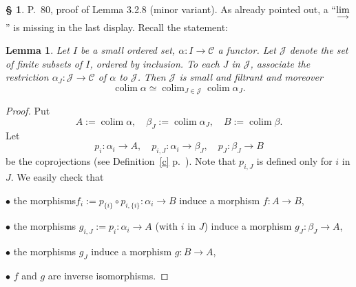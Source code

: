 \documentclass[12pt]{article}%
\newtheorem{lem}[thm]{Lemma}
\theoremstyle{remark}
\theoremstyle{definition}
\newtheorem{s}[thm]{\S}%
\newcommand{\bu}{\bullet}
\newcommand{\nn}{\noindent}
\newcommand{\cc}{\mathcal}
\newcommand{\C}{\mathcal C}
\newcommand{\ilim}{\operatornamewithlimits{\underset{\longrightarrow}{lim}}}
\DeclareMathOperator*{\colim}{colim}%
\begin{document}
\begin{s} 
P.~80, proof of Lemma 3.2.8 (minor variant). As already pointed out, a ``$\ds\ilim$'' is missing in the last display. Recall the statement:
\begin{lem}
Let $I$ be a small ordered set, $\alpha:I\to\C$ a functor. Let $\cc J$ denote the set of finite subsets of $I$, ordered by inclusion. To each $J$ in $\cc J$, associate the restriction $\alpha_J:\cc J\to\C$ of $\alpha$ to $\cc J$. Then $\cc J$ is small and filtrant and moreover
$$
\colim\alpha\simeq\colim_{J\in\cc J}\colim\alpha_J.
$$
\end{lem}
\begin{proof}
Put
$$
A:=\colim\alpha,\quad
\beta_J:=\colim\alpha_J,\quad
B:=\colim\beta.
$$
Let 
$$
p_i:\alpha_i\to A,\quad 
p_{i,J}:\alpha_i\to\beta_J,\quad 
p_J:\beta_J\to B
$$
be the coprojections (see Definition~\ref{c} p.~\pageref{c}). Note that $p_{i,J}$ is defined only for $i$ in $J$. We easily check that 

\nn$\bu$ the morphisms$f_i:=p_{\{i\}}\circ p_{i,\{i\}}:\alpha_i\to B$ induce a morphism $f:A\to B$, 

\nn$\bu$ the morphisms $g_{i,J}:=p_i:\alpha_i\to A$ (with $i$ in $J$) induce a morphism $g_J:\beta_J\to A$, 

\nn$\bu$ the morphisms $g_J$ induce a morphism $g:B\to A$, 

\nn$\bu$ $f$ and $g$ are inverse isomorphisms.
\end{proof}
\end{s}

%
\end{document}
